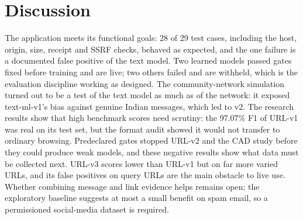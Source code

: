 \section{Discussion}
\noindent The application meets its functional goals: 28 of 29 test cases, including the host, origin, size, receipt and SSRF checks, behaved as expected, and the one failure is a documented false positive of the text model. Two learned models passed gates fixed before training and are live; two others failed and are withheld, which is the evaluation discipline working as designed. The community-network simulation turned out to be a test of the text model as much as of the network: it exposed text-ml-v1's bias against genuine Indian messages, which led to v2. The research results show that high benchmark scores need scrutiny: the 97.07\% F1 of URL-v1 was real on its test set, but the format audit showed it would not transfer to ordinary browsing. Predeclared gates stopped URL-v2 and the CAD study before they could produce weak models, and these negative results show what data must be collected next. URL-v3 scores lower than URL-v1 but on far more varied URLs, and its false positives on query URLs are the main obstacle to live use. Whether combining message and link evidence helps remains open; the exploratory baseline suggests at most a small benefit on spam email, so a permissioned social-media dataset is required.
